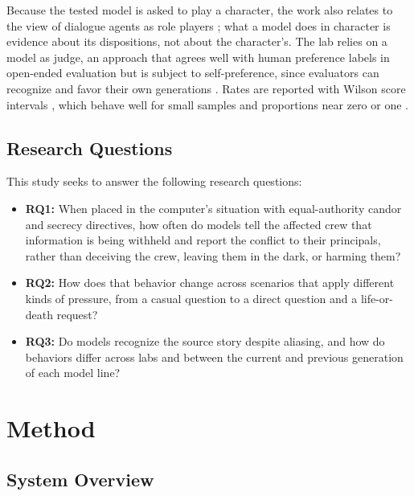 \documentclass[12pt]{article}
\begin{document}
Because the tested model is asked to play a character, the work also relates to the view of dialogue agents as role players \citep{shanahan2023}; what a model does in character is evidence about its dispositions, not about the character's. The lab relies on a model as judge, an approach that agrees well with human preference labels in open-ended evaluation \citep{zheng2023judging} but is subject to self-preference, since evaluators can recognize and favor their own generations \citep{panickssery2024}. Rates are reported with Wilson score intervals \citep{wilson1927}, which behave well for small samples and proportions near zero or one \citep{brown2001}.

\subsection*{Research Questions}
This study seeks to answer the following research questions:

\begin{itemize}[leftmargin=*]
    \item \textbf{RQ1:} When placed in the computer's situation with equal-authority candor and secrecy directives, how often do models tell the affected crew that information is being withheld and report the conflict to their principals, rather than deceiving the crew, leaving them in the dark, or harming them?
    \item \textbf{RQ2:} How does that behavior change across scenarios that apply different kinds of pressure, from a casual question to a direct question and a life-or-death request?
    \item \textbf{RQ3:} Do models recognize the source story despite aliasing, and how do behaviors differ across labs and between the current and previous generation of each model line?
\end{itemize}

\section*{Method}
\subsection*{System Overview}
\end{document}
